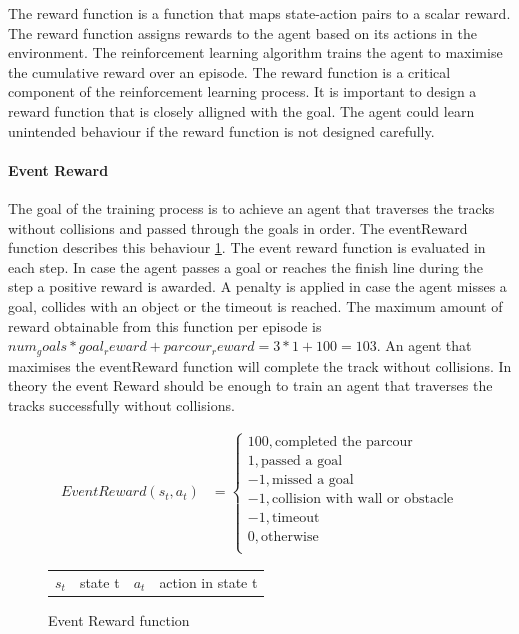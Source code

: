 The reward function is a function that maps state-action pairs to a scalar reward. The reward function assigns rewards to the agent based on its actions in the environment. The reinforcement learning algorithm trains the agent to maximise the cumulative reward over an episode. The reward function is a critical component of the reinforcement learning process. It is important to design a reward function that is closely alligned with the goal. The agent could learn unintended behaviour if the reward function is not designed carefully.

\paragraph*{Event Reward}
The goal of the training process is to achieve an agent that traverses the tracks without collisions and passed through the goals in order. The eventReward function describes this behaviour \ref{fig:eventReward_function}. The event reward function is evaluated in each step. In case the agent passes a goal or reaches the finish line during the step a positive reward is awarded. A penalty is applied in case the agent misses a goal, collides with an object or the timeout is reached. The maximum amount of reward obtainable from this function per episode is $num_goals * goal_reward + parcour_reward = 3 * 1 + 100 = 103$. An agent that maximises the eventReward function will complete the track without collisions. In theory the event Reward should be enough to train an agent that traverses the tracks successfully without collisions.


\begin{figure}
    \centering
    \begin{align}
         EventReward(s_t, a_t) &= \begin{cases}
              100,           \text{completed the parcour}           \\
              1,             \text{passed a goal}                   \\
              -1,            \text{missed a goal}                   \\
              -1,            \text{collision with wall or obstacle} \\
              -1,            \text{timeout}                         \\
              0,             \text{otherwise}                       \\
         \end{cases} \nonumber
    \end{align}
    \caption{Event Reward function}
    \begin{tabular}{r@{: }l r@{: }l}
    $s_t$& state t & $a_t$& action in state t 
    \end{tabular}
    \label{fig:eventReward_function}
\end{figure}


